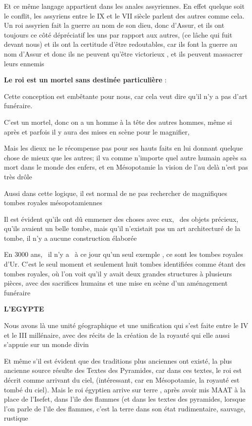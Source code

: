 \documentclass[a4paper]{article}
\begin{document}
Et ce même langage appartient dans les anales assyriennes. En effet quelque soit le conflit, les assyriens entre le IX
et le VII siècle parlent des autres comme cela. Un roi assyrien fait la guerre au nom de son dieu, donc d'Assur, et ils
ont toujours ce côté dépréciatif les uns par rapport aux autres, (ce lâche qui fuit devant nous) et ils ont la
certitude d'être redoutables, car ils font la guerre au nom d'Assur et donc ils ne peuvent qu'être victorieux , et ils
peuvent massacrer leurs ennemis


\textbf{Le roi est un mortel sans destinée particulière} : 


Cette conception est embêtante pour nous, car cela veut dire qu'il n'y a pas d'art funéraire.

C'est un mortel, donc on a un homme à la tête des autres hommes, même si après et parfois il y aura des mises en scène
pour le magnifier, 

Mais les dieux ne le récompense pas pour ses hauts faits en lui donnant quelque chose de mieux que les autres; il va
comme n'importe quel autre humain après sa mort dans le monde des enfers, et en Mésopotamie la vision de l'au delà
n'est pas très drôle


Aussi dans cette logique, il est normal de ne pas rechercher de magnifiques tombes royales mésopotamiennes

Il est évident qu'ils ont dû emmener des choses avec eux, \ des objets précieux, qu'ils avaient un belle tombe, mais
qu'il n'existait pas un art architecturé de la tombe, il n'y a aucune construction élaborée

En 3000 ans, \ il n'y a \ à ce jour qu'un seul exemple , ce sont les tombes royales d'Ur. C'est le seul moment et
seulement huit tombes identifiées comme étant des tombes royales, où l'on voit qu'il y avait deux grandes structures à
plusieurs pièces, avec des sacrifices humains et une mise en scène d'un aménagement funéraire



\textbf{L'EGYPTE}


Nous avons là une unité géographique et une unification qui s'est faite entre le IV et le III millénaire, avec des
récits de la création de la royauté qui elle aussi s'appuie sur un monde divin

Et même s'il est évident que des traditions plus anciennes ont existé, la plus ancienne source résulte des Textes des
Pyramides, car dans ces textes, le roi est décrit comme arrivant du ciel, (intéressant, car en Mésopotamie, la royauté
est tombé du ciel). Mais le roi égyptien arrive sur terre , après avoir mis MAAT à la place de l'Isefet, dans l'ile des
flammes (et dans les textes des pyramides, lorsque l'on parle de l'ile des flammes, c'est la terre dans son état
rudimentaire, sauvage, rustique
\end{document}
